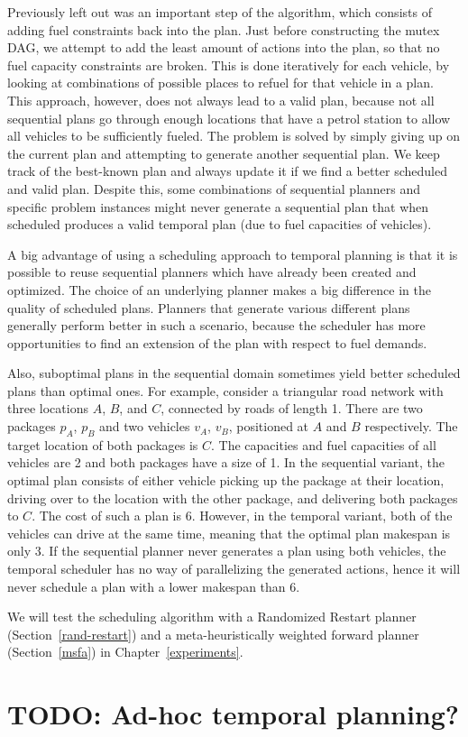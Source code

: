 Previously left out was an important step of the algorithm,
which consists of adding fuel constraints back into the plan.
Just before constructing the mutex DAG,
we attempt to add the least amount of  actions
into the plan, so that no fuel capacity constraints are broken.
This is done iteratively for each vehicle,
by looking at combinations of possible places to refuel for that vehicle in a plan.
This approach, however, does not always lead to a valid plan,
because not all
sequential plans go through enough locations that have a petrol station
to allow all vehicles to be sufficiently fueled.
The problem is solved by simply giving up on the current plan
and attempting to generate another sequential plan.
We keep track of the best-known plan and always update it
if we find a better scheduled and valid plan.
Despite this, some combinations of sequential planners
and specific problem instances might never generate a sequential plan
that when scheduled produces a valid temporal plan (due to fuel capacities of vehicles).

A big advantage of using a scheduling approach to temporal planning
is that it is possible to
reuse sequential planners which have already been created
and optimized.
The choice of an underlying planner makes a big difference
in the quality of scheduled plans. Planners
that generate various different plans generally perform better
in such a scenario, because the scheduler has more
opportunities to find an extension of the plan with respect to fuel demands.

Also, suboptimal plans in the sequential domain
sometimes yield better scheduled plans than optimal ones.
For example, consider a triangular road network with three locations $A$, $B$, and $C$, connected by roads of length 1.
There are two packages $p_A$, $p_B$ and two vehicles $v_A$, $v_B$,
positioned at $A$ and $B$ respectively. The target location of both
packages is $C$. The capacities and fuel capacities of all vehicles
are 2 and both packages have a size of 1.
In the sequential variant, the optimal plan consists of either
vehicle picking up the package at their location, driving
over to the location with the other package, and delivering both packages
to $C$. The cost of such a plan is $6$.
However, in the temporal variant, both of the vehicles can drive at the same time, meaning that the optimal plan makespan is only $3$.
If the sequential planner never generates a plan
using both vehicles, the temporal scheduler has no way of
parallelizing the generated actions, hence it will never
schedule a plan with a lower makespan than $6$.

We will test the scheduling algorithm with a Randomized Restart planner (Section~\ref{rand-restart})
and a meta-heuristically weighted forward planner (Section~\ref{msfa}) in Chapter~\ref{experiments}.



























\section{TODO: Ad-hoc temporal planning?}\label{temporal-approach}
